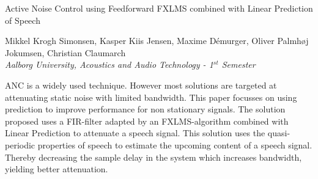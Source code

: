 
\begin{center}
\begin{huge}
Active Noise Control using Feedforward FXLMS combined with Linear Prediction of Speech
\end{huge}

\vspace{5mm}
Mikkel Krogh Simonsen, Kasper Kiis Jensen, Maxime Démurger, Oliver Palmhøj Jokumsen, Christian Claumarch
\\
\textit{Aalborg University, Acoustics and Audio Technology - 1$^{st}$ Semester}


\vspace{5mm}

ANC is a widely used technique. However most solutions are targeted at attenuating static noise with limited bandwidth. This paper focusses on using prediction to improve performance for non stationary signals.
The solution proposed uses a FIR-filter adapted by an FXLMS-algorithm combined with Linear Prediction to attenuate a speech signal. This solution uses the quasi-periodic properties of speech to estimate the upcoming content of a speech signal. Thereby decreasing the sample delay in the system which increases bandwidth, yielding better attenuation.















\end{center}